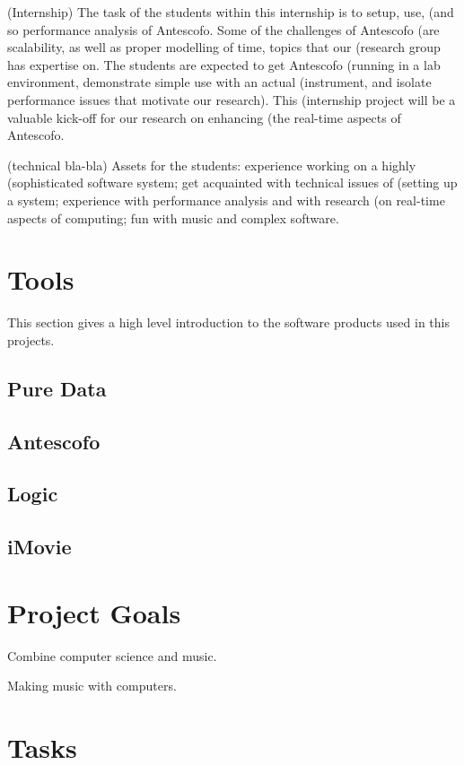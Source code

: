 \documentclass[onecolumn,nocopyrightspace,preprint]{sigplanconf}
\begin{document}
(Internship) The task of the students within this internship is to setup, use,
(and so performance analysis of Antescofo. Some of the challenges of Antescofo
(are scalability, as well as proper modelling of time, topics that our
(research group has expertise on. The students are expected to get Antescofo
(running in a lab environment, demonstrate simple use with an actual
(instrument, and isolate performance issues that motivate our research). This
(internship project will be a valuable kick-off for our research on enhancing
(the real-time aspects of Antescofo.

(technical bla-bla) Assets for the students: experience working on a highly
(sophisticated software system; get acquainted with technical issues of
(setting up a system; experience with performance analysis and with research
(on real-time aspects of computing; fun with music and complex software.

\section{Tools}
This section gives a high level introduction to the software products
used in this projects.

\subsection{Pure Data}

\subsection{Antescofo}

\subsection{Logic}

\subsection{iMovie}

\section{Project Goals}

Combine computer science and music.

Making music with computers.


\section{Tasks}
\end{document}
